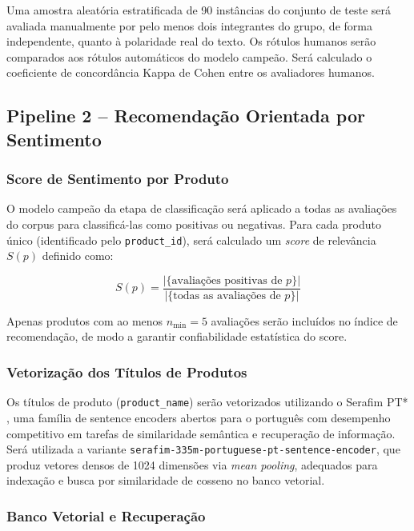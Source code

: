 \documentclass{IEEEtran}
\begin{document}
Uma amostra aleatória estratificada de 90 instâncias do conjunto de teste será avaliada manualmente por pelo menos dois integrantes do grupo, de forma independente, quanto à polaridade real do texto. Os rótulos humanos serão comparados aos rótulos automáticos do modelo campeão. Será calculado o coeficiente de concordância Kappa de Cohen entre os avaliadores humanos.

\subsection{Pipeline 2 -- Recomendação Orientada por Sentimento}
\label{subsec:pipeline2}

\subsubsection{Score de Sentimento por Produto}
\label{subsubsec:sentiment_score}

O modelo campeão da etapa de classificação será aplicado a todas as avaliações do corpus para classificá-las como positivas ou negativas. Para cada produto único (identificado pelo \texttt{product\_id}), será calculado um \textit{score} de relevância $S(p)$ definido como:

\begin{equation}
  S(p) = \frac{|\{\text{avaliações positivas de } p\}|}{|\{\text{todas as avaliações de } p\}|}
  \label{eq:score}
\end{equation}

Apenas produtos com ao menos $n_{\min}=5$ avaliações serão incluídos no índice de recomendação, de modo a garantir confiabilidade estatística do score.

\subsubsection{Vetorização dos Títulos de Produtos}
\label{subsubsec:vectorization}
Os títulos de produto (\texttt{product\_name}) serão vetorizados utilizando o Serafim PT* \cite{gomes2024serafim}, uma família de sentence encoders abertos para o português com desempenho competitivo em tarefas de similaridade semântica e recuperação de informação. Será utilizada a variante \texttt{serafim-335m-portuguese-pt-sentence-encoder}, que produz vetores densos de 1024 dimensões via \textit{mean pooling}, adequados para indexação e busca por similaridade de cosseno no banco vetorial.

\subsubsection{Banco Vetorial e Recuperação}
\label{subsubsec:vectordb}
\end{document}
